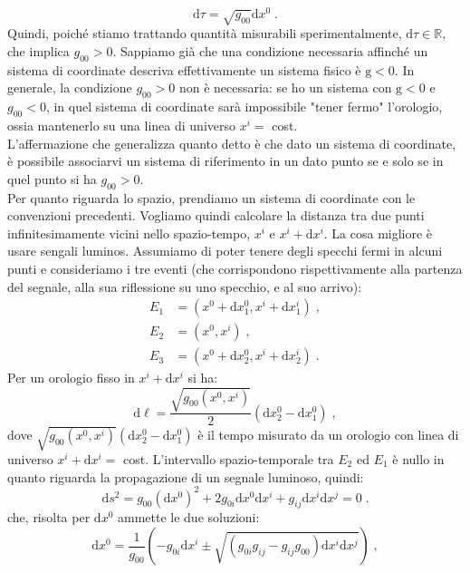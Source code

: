 \documentclass[12pt,a4paper]{report}
\theoremstyle{definition}
\newcommand{\diff}[1][]{\mathrm{d}#1}
\begin{document}
$$
\diff{\tau}=\sqrt{g_{00}}\diff{x^0}\;.
$$
Quindi, poiché stiamo trattando quantità misurabili sperimentalmente, $\diff{\tau}\in\mathbb{R}$, che implica $g_{00}>0$. Sappiamo già che una condizione necessaria affinché un sistema di coordinate descriva effettivamente un sistema fisico è $\mathrm{g}<0$. In generale, la condizione $g_{00}>0$ non è necessaria: se ho un sistema con $\mathrm{g}<0$ e $g_{00}<0$, in quel sistema di coordinate sarà impossibile "tener fermo" l'orologio, ossia mantenerlo su una linea di universo $x^i=$ cost. \\
L'affermazione che generalizza quanto detto è che dato un sistema di coordinate, è possibile associarvi un sistema di riferimento in un dato punto se e solo se in quel punto si ha $g_{00}>0$. \\
Per quanto riguarda lo spazio, prendiamo un sistema di coordinate con le convenzioni precedenti. Vogliamo quindi calcolare la distanza tra due punti infinitesimamente vicini nello spazio-tempo, $x^i$ e $x^i+\diff{x^i}$. La cosa migliore è usare sengali luminos. Assumiamo di poter tenere degli specchi fermi in alcuni punti e consideriamo i tre eventi (che corrispondono rispettivamente alla partenza del segnale, alla sua riflessione su uno specchio, e al suo arrivo):
\begin{align*}
E_1 &= (x^0+\diff{x^0_1},x^i+\diff{x^i_1})\;, \\
E_2 &= (x^0,x^i)\;, \\
E_3 &= (x^0+\diff{x^0_2},x^i+\diff{x^i_2})\;.
\end{align*}
Per un orologio fisso in $x^i+\diff{x^i}$ si ha:
\begin{equation}
\diff{\ell}=\frac{\sqrt{g_{00}(x^0,x^i)}}{2}\left(\diff{x^0_2}-\diff{x^0_1}\right)\;, \label{ch1_dell}
\end{equation}
dove $\sqrt{g_{00}(x^0,x^i)}\left(\diff{x^0_2}-\diff{x^0_1}\right)$ è il tempo misurato da un orologio con linea di universo $x^i+\diff{x^i}=$ cost. L'intervallo spazio-temporale tra $E_2$ ed $E_1$ è nullo in quanto riguarda la propagazione di un segnale luminoso, quindi:
\begin{equation}
\diff{s^2}=g_{00}\left(\diff{x^0}\right)^2+2g_{0i}\diff{x^0}\diff{x^i}+g_{ij}\diff{x^i}\diff{x^j}=0\;.
\end{equation}
che, risolta per $\diff{x^0}$ ammette le due soluzioni:
\begin{equation}
\diff{x^0}=\frac{1}{g_{00}}\left(-g_{0i}\diff{x^i}\pm \sqrt{(g_{0i}g_{ij}-g_{ij}g_{00})\diff{x^i}\diff{x^j}}\right)\;, \label{ch1_dx0}
\end{equation}
\end{document}
